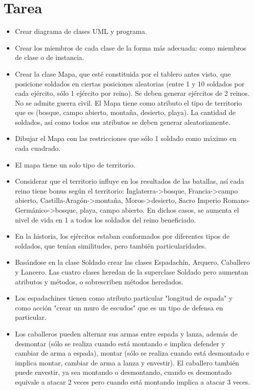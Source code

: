 \documentclass{article}
\begin{document}

	\section{Tarea}
	\begin{itemize}		
        \item Crear diagrama de clases UML y programa.
        \item Crear los miembros de cada clase de la forma más adecuada: como miembros de clase o de instancia.
        \item Crear la clase Mapa, que esté constituida por el tablero antes visto, que posicione soldados en ciertas posiciones aleatorias (entre 1 y 10 soldados por cada ejército, sólo 1 ejército por reino). Se deben generar ejércitos de 2 reinos. No se admite guerra civil. El Mapa tiene como atributo el tipo de territorio que es (bosque, campo abierto, montaña, desierto, playa). La cantidad de soldados, así como todos sus atributos se deben generar aleatoriamente.
        \item Dibujar el Mapa con las restricciones que sólo 1 soldado como máximo en cada cuadrado.
        \item El mapa tiene un solo tipo de territorio.
        \item Considerar que el territorio influye en los resultados de las batallas, así cada reino tiene bonus según el territorio: Inglaterra->bosque, Francia->campo abierto, Castilla-Aragón->montaña, Moros->desierto, Sacro Imperio Romano-Germánico->bosque, playa, campo abierto. En dichos casos, se aumenta el nivel de vida en 1 a todos los soldados del reino beneficiado.
        \item En la historia, los ejércitos estaban conformados por diferentes tipos de soldados, que tenían similitudes, pero también particularidades.
        \item Basándose en la clase Soldado crear las clases Espadachín, Arquero, Caballero y Lancero. Las cuatro clases heredan de la superclase Soldado pero aumentan atributos y métodos, o sobrescriben métodos heredados.
        \item Los espadachines tienen como atributo particular "longitud de espada" y como acción "crear un muro de escudos" que es un tipo de defensa en particular.
        \item Los caballeros pueden alternar sus armas entre espada y lanza, además de desmontar (sólo se realiza cuando está montando e implica defender y cambiar de arma a espada), montar (sólo se realiza cuando está desmontado e implica montar, cambiar de arma a lanza y envestir). El caballero también puede envestir, ya sea montando o desmontando, cuando es desmontado equivale a atacar 2 veces pero cuando está montando implica a atacar 3 veces.

\end{itemize}
\end{document}
